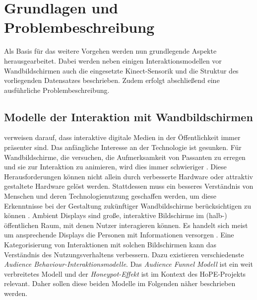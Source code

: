 \chapter{Grundlagen und Problembeschreibung}
\label{chapter2}
Als Basis für das weitere Vorgehen
werden nun grundlegende Aspekte herausgearbeitet.
Dabei werden neben einigen Interaktionsmodellen vor Wandbildschirmen
auch die eingesetzte Kinect-Sensorik und die Struktur des vorliegenden Datensatzes beschrieben.
Zudem erfolgt abschließend eine ausführliche Problembeschreibung.

\section{Modelle der Interaktion mit Wandbildschirmen}
\label{2-ModelleInteraktion-Wandbildschirme}
\citet{wouters_uncovering_2016} verweisen darauf, dass interaktive digitale Medien in der Öffentlichkeit immer präsenter sind.
Das anfängliche Interesse an der Technologie ist gesunken.
Für Wandbildschirme, die versuchen, die Aufmerksamkeit von Passanten zu erregen
und sie zur Interaktion zu animieren, wird dies immer schwieriger \citep{wouters_uncovering_2016}.
Diese Herausforderungen können nicht allein durch verbesserte Hardware
oder attraktiv gestaltete Hardware gelöst werden.
Stattdessen muss ein besseres Verständnis von Menschen und deren Technologienutzung geschaffen werden,
um diese Erkenntnisse bei der Gestaltung zukünftiger Wandbildschirme berücksichtigen zu können \citep{wouters_uncovering_2016}.
Ambient Displays sind große, interaktive Bildschirme im (halb-) öffentlichen Raum, mit denen Nutzer interagieren können.
Es handelt sich meist um ansprechende Displays die Personen mit Informationen versorgen \citep{mankoff_heuristic_2003}.
Eine Kategorisierung von Interaktionen mit solchen Bildschirmen kann das Verständnis des Nutzungsverhaltens verbessern.
Dazu existieren verschiedenste \emph{Audience Behaviour-Interaktionsmodelle}.
Das \emph{Audience Funnel Modell} ist ein weit verbreitetes Modell
und der \emph{Honeypot-Effekt} ist im Kontext des HoPE-Projekts relevant.
Daher sollen diese beiden Modelle im Folgenden näher beschrieben werden.


